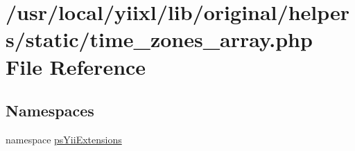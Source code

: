 \hypertarget{time__zones__array_8php}{
\section{/usr/local/yiixl/lib/original/helpers/static/time\_\-zones\_\-array.php File Reference}
\label{time__zones__array_8php}
}
\subsection*{Namespaces}
\begin{DoxyCompactItemize}
\item 
namespace \hyperlink{namespacepsYiiExtensions}{psYiiExtensions}
\end{DoxyCompactItemize}

